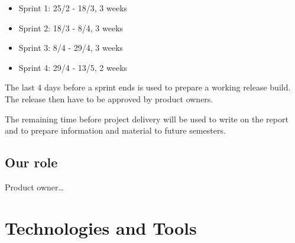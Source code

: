 \begin{itemize}
    \item Sprint 1: 25/2 - 18/3, 3 weeks
    \item Sprint 2: 18/3 - 8/4, 3 weeks
    \item Sprint 3: 8/4 - 29/4, 3 weeks
    \item Sprint 4: 29/4 - 13/5, 2 weeks
\end{itemize}

The last 4 days before a sprint ends is used to prepare a working release build. 
The release then have to be approved by product owners.

The remaining time before project delivery will be used to write on the report and to prepare information and material to future semesters. 


\subsection{Our role}
Product owner…


\section{Technologies and Tools}


